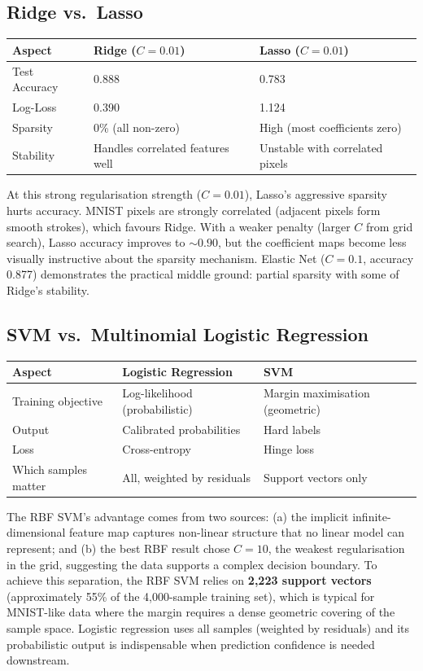 \documentclass[10pt, letterpaper]{article}
\begin{document}
\subsection{Ridge vs.\ Lasso}
\begin{center}\small
\renewcommand{\arraystretch}{1.2}
\begin{tabular}{@{}lll@{}}
\toprule
Aspect & Ridge ($C = 0.01$) & Lasso ($C = 0.01$) \\
\midrule
Test Accuracy & 0.888 & 0.783 \\
Log-Loss & 0.390 & 1.124 \\
Sparsity & 0\% (all non-zero) & High (most coefficients zero) \\
Stability & Handles correlated features well & Unstable with correlated pixels \\
\bottomrule
\end{tabular}
\end{center}

At this strong regularisation strength ($C = 0.01$), Lasso's aggressive sparsity hurts accuracy. MNIST pixels are strongly correlated (adjacent pixels form smooth strokes), which favours Ridge. With a weaker penalty (larger $C$ from grid search), Lasso accuracy improves to $\sim 0.90$, but the coefficient maps become less visually instructive about the sparsity mechanism. Elastic Net ($C = 0.1$, accuracy 0.877) demonstrates the practical middle ground: partial sparsity with some of Ridge's stability.

\subsection{SVM vs.\ Multinomial Logistic Regression}
\begin{center}\small
\renewcommand{\arraystretch}{1.2}
\begin{tabular}{@{}p{3.2cm}p{5cm}p{5cm}@{}}
\toprule
Aspect & Logistic Regression & SVM \\
\midrule
Training objective & Log-likelihood (probabilistic) & Margin maximisation (geometric) \\
Output & Calibrated probabilities & Hard labels \\
Loss & Cross-entropy & Hinge loss \\
Which samples matter & All, weighted by residuals & Support vectors only \\
\bottomrule
\end{tabular}
\end{center}

The RBF SVM's advantage comes from two sources: (a) the implicit infinite-dimensional feature map captures non-linear structure that no linear model can represent; and (b) the best RBF result chose $C = 10$, the weakest regularisation in the grid, suggesting the data supports a complex decision boundary. To achieve this separation, the RBF SVM relies on \textbf{2,223 support vectors} (approximately 55\% of the 4,000-sample training set), which is typical for MNIST-like data where the margin requires a dense geometric covering of the sample space. Logistic regression uses all samples (weighted by residuals) and its probabilistic output is indispensable when prediction confidence is needed downstream.
\end{document}

